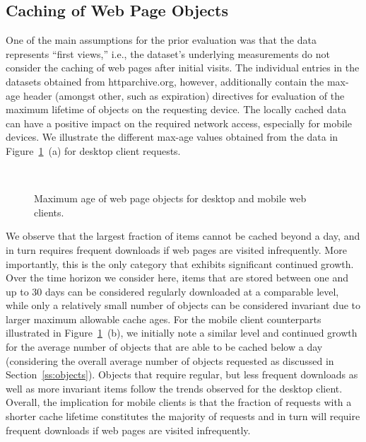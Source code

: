 \subsection*{Caching of Web Page Objects}
One of the main assumptions for the prior evaluation was that the data represents ``first views,'' i.e., the dataset's underlying measurements do not consider the caching of web pages after initial visits. 
The individual entries in the datasets obtained from httparchive.org, however, additionally contain the max-age header (amongst other, such as expiration) directives for evaluation of the maximum lifetime of objects on the requesting device. The locally cached data can have a positive impact on the required network access, especially for mobile devices.
We illustrate the different max-age values obtained from the data in Figure~\ref{fig:maxage}~(a) for desktop client requests.
\begin{figure}
	\centering
	\qquad
	\\
	\caption{Maximum age of web page objects for desktop and mobile web clients.\label{fig:maxage}}
\end{figure}
We observe that the largest fraction of items cannot be cached beyond a day, and in turn requires frequent downloads if web pages are visited infrequently. 
More importantly, this is the only category that exhibits significant continued growth.
Over the time horizon we consider here, items that are stored between one and up to 30 days can be considered regularly downloaded at a comparable level, while only a relatively small number of objects can be considered invariant due to larger maximum allowable cache ages.
For the mobile client counterparts illustrated in Figure~\ref{fig:maxage}~(b), we initially note a similar level and continued growth for the average number of objects that are able to be cached below a day (considering the overall average number of objects requested as discussed in Section~\ref{ss:objects}).
Objects that require regular, but less frequent downloads as well as more invariant items follow the trends observed for the desktop client.
Overall, the implication for mobile clients is that the fraction of requests with a shorter cache lifetime constitutes the majority of requests and in turn will require frequent downloads if web pages are visited infrequently.


